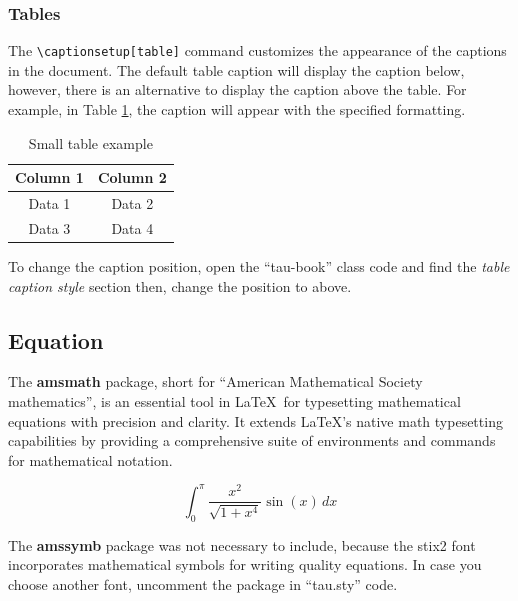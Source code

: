 \documentclass[10pt,a4paper,twoside]{tau-book}
\begin{document}
		\subsubsection{Tables}

            The \verb*|\captionsetup[table]| command customizes the appearance of the captions in the document. The default table caption will display the caption below, however, there is an alternative to display the caption above the table. For example, in Table \ref{tab:example}, the caption will appear with the specified formatting.
        
            \begin{table}[H]
                \centering
                \begin{tabular}{cc}
                    \textbf{Column 1} & \textbf{Column 2} \\
                    \midrule
                    Data 1 & Data 2 \\
                    Data 3 & Data 4 \\
                    \bottomrule
                \end{tabular}
                \caption{Small table example}
                \label{tab:example}
            \end{table}

            To change the caption position, open the ``tau-book'' class code and find the \textit{table caption style} section then, change the position to above.
            
    \subsection{Equation}

        The \textbf{amsmath} package, short for ``American Mathematical Society mathematics'', is an essential tool in \LaTeX\ for typesetting mathematical equations with precision and clarity. It extends LaTeX's native math typesetting capabilities by providing a comprehensive suite of environments and commands for mathematical notation.

        \begin{equation}
            \int_{0}^{\pi} \frac{x^2}{\sqrt{1 + x^4}} \sin(x) \, dx
        \end{equation}

    \begin{info}
        The \textbf{amssymb} package was not necessary to include, because the stix2 font incorporates mathematical symbols for writing quality equations. In case you choose another font, uncomment the package in ``tau.sty'' code.
    \end{info}
\end{document}
